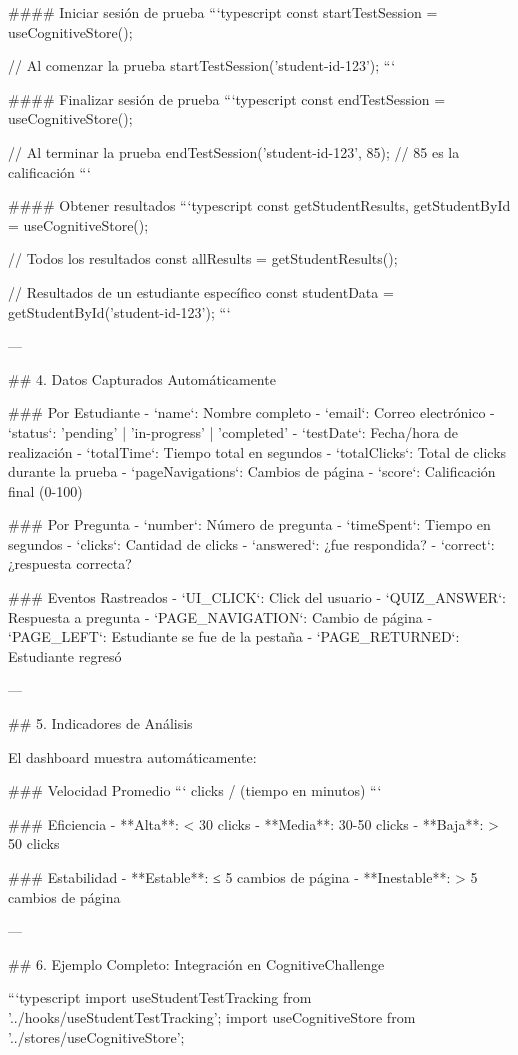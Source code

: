 #### Iniciar sesión de prueba
```typescript
const { startTestSession } = useCognitiveStore();

// Al comenzar la prueba
startTestSession('student-id-123');
```

#### Finalizar sesión de prueba
```typescript
const { endTestSession } = useCognitiveStore();

// Al terminar la prueba
endTestSession('student-id-123', 85); // 85 es la calificación
```

#### Obtener resultados
```typescript
const { getStudentResults, getStudentById } = useCognitiveStore();

// Todos los resultados
const allResults = getStudentResults();

// Resultados de un estudiante específico
const studentData = getStudentById('student-id-123');
```

---

## 4. Datos Capturados Automáticamente

### Por Estudiante
- `name`: Nombre completo
- `email`: Correo electrónico
- `status`: 'pending' | 'in-progress' | 'completed'
- `testDate`: Fecha/hora de realización
- `totalTime`: Tiempo total en segundos
- `totalClicks`: Total de clicks durante la prueba
- `pageNavigations`: Cambios de página
- `score`: Calificación final (0-100)

### Por Pregunta
- `number`: Número de pregunta
- `timeSpent`: Tiempo en segundos
- `clicks`: Cantidad de clicks
- `answered`: ¿fue respondida?
- `correct`: ¿respuesta correcta?

### Eventos Rastreados
- `UI_CLICK`: Click del usuario
- `QUIZ_ANSWER`: Respuesta a pregunta
- `PAGE_NAVIGATION`: Cambio de página
- `PAGE_LEFT`: Estudiante se fue de la pestaña
- `PAGE_RETURNED`: Estudiante regresó

---

## 5. Indicadores de Análisis

El dashboard muestra automáticamente:

### Velocidad Promedio
```
clicks / (tiempo en minutos)
```

### Eficiencia
- **Alta**: < 30 clicks
- **Media**: 30-50 clicks
- **Baja**: > 50 clicks

### Estabilidad
- **Estable**: ≤ 5 cambios de página
- **Inestable**: > 5 cambios de página

---

## 6. Ejemplo Completo: Integración en CognitiveChallenge

```typescript
import { useStudentTestTracking } from '../hooks/useStudentTestTracking';
import { useCognitiveStore } from '../stores/useCognitiveStore';

